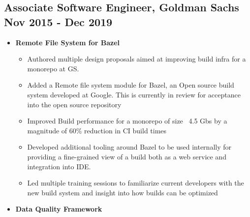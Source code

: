 \begin{itemize}[label=\textperiodcentered,labelindent=0pt,itemindent=1em,leftmargin=0.3cm,itemsep=0pt]
\subsection*{\small{Associate Software Engineer, Goldman Sachs \hfill Nov 2015 - Dec 2019}}
\begin{itemize}[label=\textperiodcentered,labelindent=0pt,itemindent=1em,leftmargin=0.3cm,itemsep=0pt]
    \begin{itemize}[label=\textperiodcentered,itemindent=1em,leftmargin=0.3cm,itemsep=0pt]
        \item \textbf{Remote File System for Bazel}
            \begin{itemize}
                \item {Authored multiple design proposals aimed at improving build infra for a monorepo at GS.}
                \item {Added a Remote file system module for Bazel, an Open source build system developed at Google. This is currently in review for acceptance into the open source repository}
                \item Improved Build performance for a monorepo of size ~4.5 Gbs by a magnitude of 60\% reduction in CI build times
                \item Developed additional tooling around Bazel to be used internally for providing a fine-grained view of a build both as a web service and integration into IDE. 
                \item Led multiple training sessions to familiarize current developers with the new build system and insight into how builds can be optimized
            \end{itemize}
            
        \item \textbf{Data Quality Framework}
        

\end{itemize}
\end{itemize}
\end{itemize}
